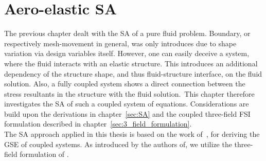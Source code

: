 \documentclass[../main.tex]{subfiles}
\begin{document}
\chapter{Aero-elastic \acl{SA}}\label{sec:aeroelastic_sa}
\minitoc

The previous chapter dealt with the \ac{SA} of a pure fluid problem. Boundary, or respectively mesh-movement in general, was only introduces due to shape variation via design variables itself. However, one can easily deceive a system, where the fluid interacts with an elastic structure. This introduces an additional dependency of the structure shape, and thus fluid-structure interface, on the fluid solution. Also, a fully coupled system shows a direct connection between the stress resultants in the structure with the fluid solution.\
This chapter therefore investigates the \ac{SA} of such a coupled system of equations. Considerations are build upon the derivations in chapter~\ref{sec:SA} and the coupled three-field \ac{FSI} formulation described in chapter~\ref{sec:3_field_formulation}.\\
The \ac{SA} approach applied in this thesis is based on the work of~\cite{Sobieszczanski1990}, for deriving the \ac{GSE} of coupled systems. As introduced by the authors of\cite{Maute2001}, we utilize the three-field formulation of \cite{Farhat1995}.
\end{document}
